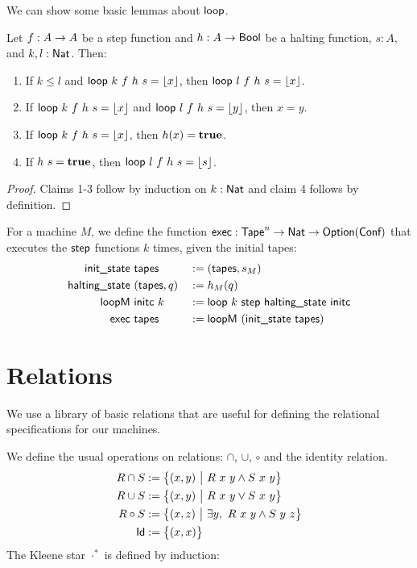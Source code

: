\documentclass{psartcl}
\begin{document}
We can show some basic lemmas about $\textsf{loop}$.
\begin{lemma}
  \label{lem:loop}
  Let $f : A \rightarrow A$ be a step function and $h : A \rightarrow \textsf{Bool}$ be a halting function, $s:A$, and $k, l:\textsf{Nat}$.  Then:
  \begin{enumerate}
    \item If $k \le l$ and $\textsf{loop}~k~f~h~s = \left\lfloor {x}\right\rfloor$, then $\textsf{loop}~l~f~h~s = \left\lfloor {x}\right\rfloor$.
    \item If $\textsf{loop}~k~f~h~s = \left\lfloor {x}\right\rfloor$ and $\textsf{loop}~l~f~h~s = \left\lfloor {y}\right\rfloor$, then $x = y$.
    \item If $\textsf{loop}~k~f~h~s = \left\lfloor {x}\right\rfloor$, then $h(x) = \mathbf{true}$.
    \item If $h~s = \mathbf{true}$, then $\textsf{loop}~l~f~h~s = \left\lfloor {s}\right\rfloor$.
  \end{enumerate}
\end{lemma}
\begin{proof}
  Claims 1-3 follow by induction on $k:\textsf{Nat}$ and claim 4 follows by definition.
\end{proof}

For a machine $M$, we define the function $\textsf{exec} : \textsf{Tape}^{n} \rightarrow \textsf{Nat} \rightarrow \textsf{Option}(\textsf{Conf})$ that executes the $\textsf{step}$ functions $k$ times,
given the initial tapes:
\begin{alignat*}{3}
  \textsf{init\_state}   &~\textsf{tapes}      &&:= (\textsf{tapes}, s_M) \\
  \textsf{halting\_state}&~(\textsf{tapes}, q) &&:= h_M(q) \\
  \textsf{loopM}         &~\textsf{initc}~k    &&:= \textsf{loop}~k~\textsf{step}~\textsf{halting\_state}~\textsf{initc} \\
  \textsf{exec}          &~\textsf{tapes}      &&:= \textsf{loopM}~(\textsf{init\_state}~\textsf{tapes})
\end{alignat*}


\section{Relations}

We use a library of basic relations that are useful for defining the relational specifications for our machines.

We define the usual operations on relations: $\cap$, $\cup$, $\circ$ and the identity relation.
\begin{alignat*}{2}
  R \cap  S &:= \bigl\{ (x, y)~\big|~R~x~y \land S~x~y \bigr \} \\
  R \cup  S &:= \bigl\{ (x, y)~\big|~R~x~y \lor  S~x~y \bigr \} \\
  R \circ S &:= \bigl\{ (x, z)~\big|~\exists y,~ R~x~y \land S~y~z \bigr \} \\
  \textsf{Id}   &:= \bigl\{ (x, x) \bigr \}{}
\end{alignat*}
The Kleene star ${\cdot}^*$ is defined by induction:
\end{document}
